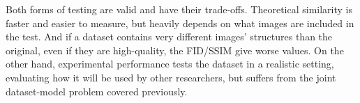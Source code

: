 Both forms of testing are valid and have their trade-offs. Theoretical similarity is faster and easier to measure, but heavily depends on what images are included in the test. And if a dataset contains very different images' structures than the original, even if they are high-quality, the FID/SSIM give worse values. On the other hand, experimental performance tests the dataset in a realistic setting, evaluating how it will be used by other researchers, but suffers from the joint dataset-model problem covered previously.

